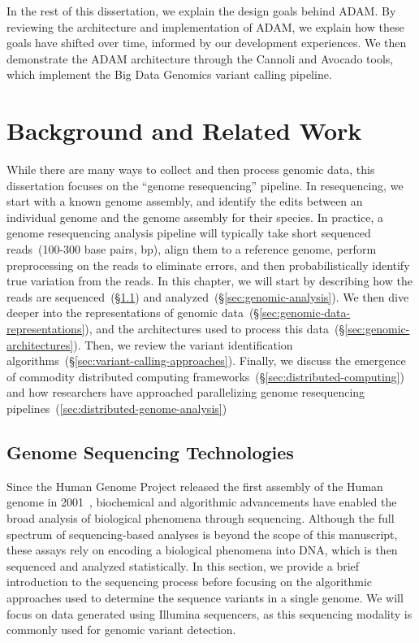 \documentclass[phd]{ucbthesis}
\begin{document}
In the rest of this dissertation, we explain the design goals behind 
{ADAM}. By reviewing the architecture and implementation of
{ADAM}, we explain how these goals have shifted over time, informed by
our development experiences. We then demonstrate the {ADAM} architecture
through the {Cannoli} and {Avocado} tools, which implement the
{Big Data Genomics} variant calling pipeline.

\chapter{Background and Related Work}
\label{chap:background}

While there are many ways to collect and then process genomic data, this
dissertation focuses on the ``genome resequencing'' pipeline. In resequencing,
we start with a known genome assembly, and identify the edits between an
individual genome and the genome assembly for their species. In practice, a
genome resequencing analysis pipeline will typically take short sequenced
reads~(100-300 base pairs, bp), align them to a reference genome, perform
preprocessing on the reads to eliminate errors, and then probabilistically
identify true variation from the reads. In this chapter, we will start by
describing how the reads are sequenced~(\S\ref{sec:genome-sequencing}) and
analyzed~(\S\ref{sec:genomic-analysis}). We then dive deeper into the
representations of genomic data~(\S\ref{sec:genomic-data-representations}),
and the architectures used to process this
data~(\S\ref{sec:genomic-architectures}). Then, we review the variant
identification algorithms~(\S\ref{sec:variant-calling-approaches}). Finally,
we discuss the emergence of commodity distributed computing
frameworks~(\S\ref{sec:distributed-computing}) and how researchers have
approached parallelizing genome resequencing
pipelines~(\ref{sec:distributed-genome-analysis})

\section{Genome Sequencing Technologies}
\label{sec:genome-sequencing}

Since the Human Genome Project released the first assembly of the Human genome
in 2001~\cite{lander01}, biochemical and algorithmic advancements have enabled
the broad analysis of biological phenomena through sequencing. Although the
full spectrum of sequencing-based analyses is beyond the scope of this
manuscript, these assays rely on encoding a biological phenomena into DNA, which
is then sequenced and analyzed statistically. In this section, we provide a
brief introduction to the sequencing process before focusing on the algorithmic
approaches used to determine the sequence variants in a single genome. We will
focus on data generated using Illumina sequencers, as this sequencing modality
is commonly used for genomic variant detection.
\end{document}
